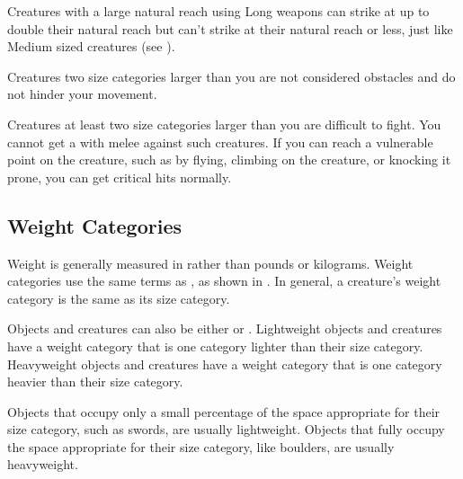         Creatures with a large natural reach using Long weapons can strike at up to double their natural reach but can't strike at their natural reach or less, just like Medium sized creatures (see ).

         Creatures two size categories larger than you are not considered obstacles and do not hinder your movement.

         Creatures at least two size categories larger than you are difficult to fight.
        You cannot get a  with melee  against such creatures.
        If you can reach a vulnerable point on the creature, such as by flying, climbing on the creature, or knocking it prone, you can get critical hits normally.

    \subsection{Weight Categories}\label{Weight Categories}
        Weight is generally measured in  rather than pounds or kilograms.
        Weight categories use the same terms as , as shown in .
        In general, a creature's weight category is the same as its size category.

        Objects and creatures can also be either  or .
        Lightweight objects and creatures have a weight category that is one category lighter than their size category.
        Heavyweight objects and creatures have a weight category that is one category heavier than their size category.

        Objects that occupy only a small percentage of the space appropriate for their size category, such as swords, are usually lightweight.
        Objects that fully occupy the space appropriate for their size category, like boulders, are usually heavyweight.

